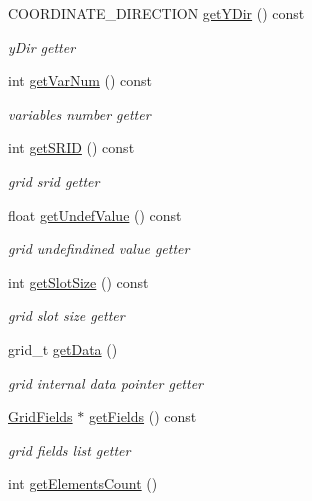\begin{DoxyCompactItemize}
C\-O\-O\-R\-D\-I\-N\-A\-T\-E\-\_\-\-D\-I\-R\-E\-C\-T\-I\-O\-N \hyperlink{classfwi_1_1grid_1_1Grid_ac8761c50efb6f2af694727b9b12d9f0e}{get\-Y\-Dir} () const 
\begin{DoxyCompactList}\small\item\em y\-Dir getter \end{DoxyCompactList}\item 
int \hyperlink{classfwi_1_1grid_1_1Grid_ad9e9ac91e9c338606e1199ffa89fc6bb}{get\-Var\-Num} () const 
\begin{DoxyCompactList}\small\item\em variables number getter \end{DoxyCompactList}\item 
int \hyperlink{classfwi_1_1grid_1_1Grid_a8aefb75a246d3a618f455d34c7e64f3f}{get\-S\-R\-I\-D} () const 
\begin{DoxyCompactList}\small\item\em grid srid getter \end{DoxyCompactList}\item 
float \hyperlink{classfwi_1_1grid_1_1Grid_a8d18ce74846ea7432f034a30ef879b59}{get\-Undef\-Value} () const 
\begin{DoxyCompactList}\small\item\em grid undefindined value getter \end{DoxyCompactList}\item 
int \hyperlink{classfwi_1_1grid_1_1Grid_adf68e16a1b1d07ed1745c57eb6732314}{get\-Slot\-Size} () const 
\begin{DoxyCompactList}\small\item\em grid slot size getter \end{DoxyCompactList}\item 
grid\-\_\-t \hyperlink{classfwi_1_1grid_1_1Grid_a73e900020a90dbad3808d3c91778a3b4}{get\-Data} ()
\begin{DoxyCompactList}\small\item\em grid internal data pointer getter \end{DoxyCompactList}\item 
\hyperlink{classfwi_1_1grid_1_1GridFields}{Grid\-Fields} $\ast$ \hyperlink{classfwi_1_1grid_1_1Grid_a2e891ed3f46840241652cd435ac35a94}{get\-Fields} () const 
\begin{DoxyCompactList}\small\item\em grid fields list getter \end{DoxyCompactList}\item 
int \hyperlink{classfwi_1_1grid_1_1Grid_abe660314639e862657818d02aad3ff45}{get\-Elements\-Count} ()

\end{DoxyCompactItemize}
